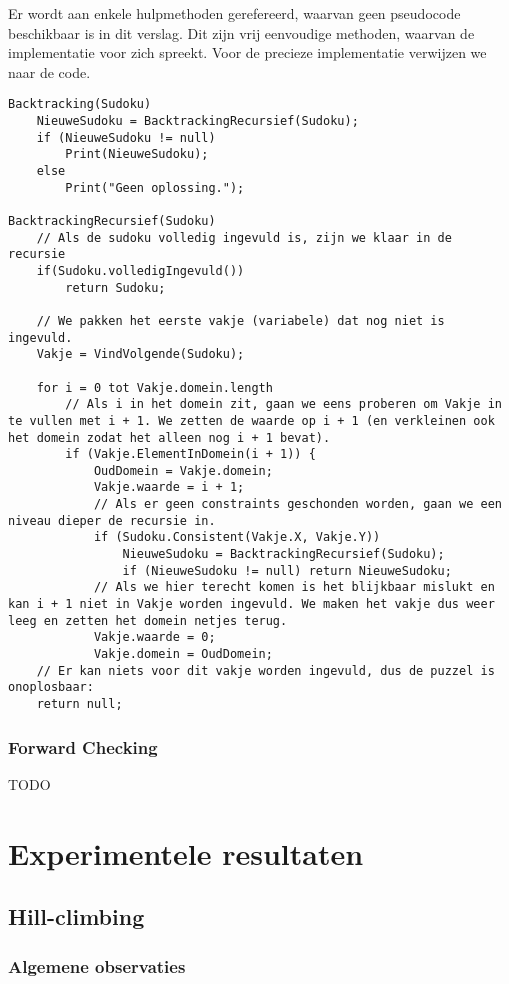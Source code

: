 \documentclass[]{report}
\begin{document}
Er wordt aan enkele hulpmethoden gerefereerd, waarvan geen pseudocode beschikbaar is in dit verslag. Dit zijn vrij eenvoudige methoden, waarvan de implementatie voor zich spreekt. Voor de precieze implementatie verwijzen we naar de code.

\begin{minipage}{\textwidth}
\begin{lstlisting}
Backtracking(Sudoku)
	NieuweSudoku = BacktrackingRecursief(Sudoku);
	if (NieuweSudoku != null)
		Print(NieuweSudoku);
	else
		Print("Geen oplossing.");

BacktrackingRecursief(Sudoku)
	// Als de sudoku volledig ingevuld is, zijn we klaar in de recursie
	if(Sudoku.volledigIngevuld())
		return Sudoku;
	
	// We pakken het eerste vakje (variabele) dat nog niet is ingevuld.	
	Vakje = VindVolgende(Sudoku);
	
	for i = 0 tot Vakje.domein.length
		// Als i in het domein zit, gaan we eens proberen om Vakje in te vullen met i + 1. We zetten de waarde op i + 1 (en verkleinen ook het domein zodat het alleen nog i + 1 bevat).
		if (Vakje.ElementInDomein(i + 1)) {
			OudDomein = Vakje.domein;
			Vakje.waarde = i + 1;
			// Als er geen constraints geschonden worden, gaan we een niveau dieper de recursie in.
			if (Sudoku.Consistent(Vakje.X, Vakje.Y))
				NieuweSudoku = BacktrackingRecursief(Sudoku);
				if (NieuweSudoku != null) return NieuweSudoku;
			// Als we hier terecht komen is het blijkbaar mislukt en kan i + 1 niet in Vakje worden ingevuld. We maken het vakje dus weer leeg en zetten het domein netjes terug. 
			Vakje.waarde = 0;
			Vakje.domein = OudDomein;
	// Er kan niets voor dit vakje worden ingevuld, dus de puzzel is onoplosbaar:
	return null;
\end{lstlisting}
\end{minipage}

\subsection{Forward Checking}
TODO

\chapter{Experimentele resultaten}
\section{Hill-climbing}
\subsection{Algemene observaties}
\end{document}
